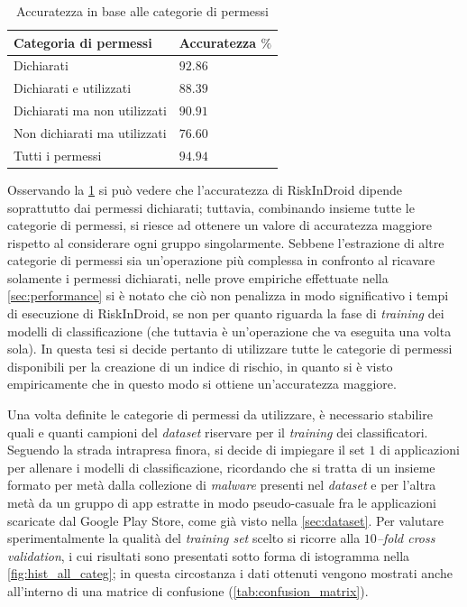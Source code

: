\documentclass[12pt,a4paper,oneside]{article}
\begin{document}
\begin{table}[!htb]
    \renewcommand{\arraystretch}{1.3}
    \centering
    \begin{tabular}{|>{\centering\arraybackslash}m{}||>{\centering\arraybackslash}m{}|}
        \hline
        Categoria di permessi & Accuratezza $\%$\\
        \hline\hline
        Dichiarati & $92.86$\\\hline
        Dichiarati e utilizzati & $88.39$\\\hline
        Dichiarati ma non utilizzati & $90.91$\\\hline
        Non dichiarati ma utilizzati & $76.60$\\\hline
        Tutti i permessi & $94.94$\\\hline
    \end{tabular}
    \caption{Accuratezza in base alle categorie di permessi}
    \label{tab:p_accuracy_comparison}
\end{table}

\noindent Osservando la \cref{tab:p_accuracy_comparison} si può vedere che l'accuratezza di RiskInDroid dipende soprattutto dai permessi dichiarati; tuttavia, combinando insieme tutte le categorie di permessi, si riesce ad ottenere un valore di accuratezza maggiore rispetto al considerare ogni gruppo singolarmente. Sebbene l'estrazione di altre categorie di permessi sia un'operazione più complessa in confronto al ricavare solamente i permessi dichiarati, nelle prove empiriche effettuate nella \cref{sec:performance} si è notato che ciò non penalizza in modo significativo i tempi di esecuzione di RiskInDroid, se non per quanto riguarda la fase di \textit{training} dei modelli di classificazione (che tuttavia è un'operazione che va eseguita una volta sola). In questa tesi si decide pertanto di utilizzare tutte le categorie di permessi disponibili per la creazione di un indice di rischio, in quanto si è visto empiricamente che in questo modo si ottiene un'accuratezza maggiore.

Una volta definite le categorie di permessi da utilizzare, è necessario stabilire quali e quanti campioni del \textit{dataset} riservare per il \textit{training} dei classificatori. Seguendo la strada intrapresa finora, si decide di impiegare il set $1$ di applicazioni per allenare i modelli di classificazione, ricordando che si tratta di un insieme formato per metà dalla collezione di \textit{malware} presenti nel \textit{dataset} e per l'altra metà da un gruppo di app estratte in modo pseudo-casuale fra le applicazioni scaricate dal Google Play Store, come già visto nella \cref{sec:dataset}. Per valutare sperimentalmente la qualità del \textit{training set} scelto si ricorre alla \textit{$10$--fold cross validation}, i cui risultati sono presentati sotto forma di istogramma nella \cref{fig:hist_all_categ}; in questa circostanza i dati ottenuti vengono mostrati anche all'interno di una matrice di confusione (\cref{tab:confusion_matrix}).
\end{document}
